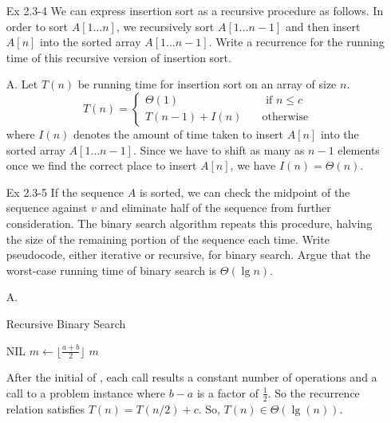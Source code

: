 \documentclass[fontsize=12pt,paper=a4]{book}
\begin{document}
\begin{enumerate}
       
 \item[Ex 2.3-4]
       We can express insertion sort as a recursive procedure as follows. In order to sort $A[1 \dots n]$, we recursively sort $A[1 \dots n-1]$ and then insert $A[n]$ into the sorted array $A[1 \dots n-1]$. Write a recurrence for the running time of this recursive version of insertion sort.
 \item[A.]
       Let $T(n)$ be running time for insertion sort on an array of size $n$.\\
       \[ T(n) = \begin{cases} \Theta(1)     & \quad \text{ if $n \leq c$} \\
         T(n-1) + I(n) & \quad \text{otherwise}      
        \end{cases} \]
       where $I(n)$ denotes the amount of time taken to insert $A[n]$ into the sorted array $A[1 \dots n-1]$. Since we have to shift as many as $n-1$ elements once we find the correct place to insert $A[n]$, we have $I(n) = \Theta(n)$.
       
 \item[Ex 2.3-5]
       If the sequence $A$ is sorted, we can check the midpoint of the sequence against $v$ and eliminate half of the sequence from further consideration. The binary search algorithm repeats this procedure, halving the size of the remaining portion of the sequence each time. Write pseudocode, either iterative or recursive, for binary search. Argue that the worst-case running time of binary search is $\Theta(\lg n)$.
 \item[A.]
       \begin{algorithm}
        \caption{Recursive Binary Search}
        \begin{algorithmic}[1]
         \State \Return \textsc{NIL}
         \EndIf
         \State $m \gets \lfloor \frac{a+b}{2} \rfloor$
         \State \Return $m$
         \EndIf
         \State \Return {}
         \EndIf
         \State \Return {}
         \EndProcedure
        \end{algorithmic}
       \end{algorithm}
       
       After the initial of , each call results a constant number of operations and a call to a problem instance where $b-a$ is a factor of $\frac{1}{2}$. So the recurrence relation satisfies $T(n) = T(n/2) + c$. So, $T(n) \in \Theta(\lg(n))$.
       

\end{enumerate}
\end{document}
